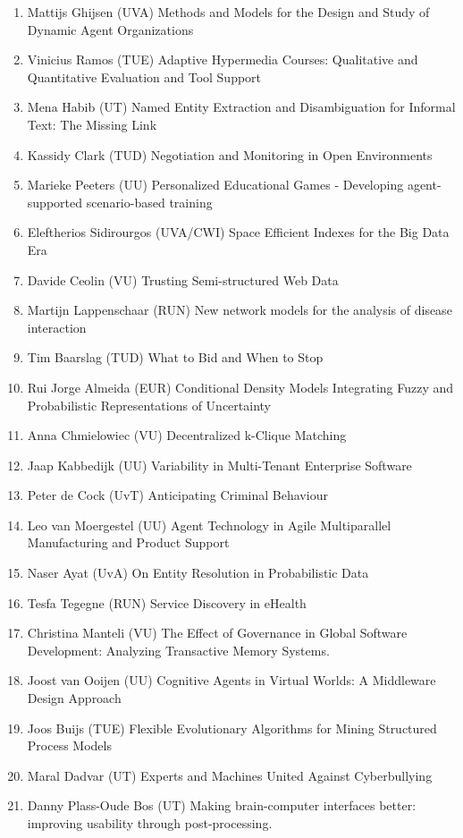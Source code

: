 \begin{multicols}{2}
\begin{scriptsize}
\begin{enumerate}[leftmargin=*,noitemsep,topsep=0pt,parsep=1pt,partopsep=0pt]
\item Mattijs Ghijsen (UVA) Methods and Models for the Design and Study of Dynamic Agent Organizations
\item Vinicius Ramos (TUE) Adaptive Hypermedia Courses: Qualitative and Quantitative Evaluation and Tool Support 
\item Mena Habib (UT) Named Entity Extraction and Disambiguation for Informal Text: The Missing Link
\item Kassidy Clark (TUD) Negotiation and Monitoring in Open Environments 
\item Marieke Peeters (UU) Personalized Educational Games - Developing agent-supported scenario-based training
\item Eleftherios Sidirourgos (UVA/CWI) Space Efficient Indexes for the Big Data Era 
\item Davide Ceolin (VU) Trusting Semi-structured Web Data
\item Martijn Lappenschaar (RUN) New network models for the analysis of disease interaction 
\item Tim Baarslag (TUD) What to Bid and When to Stop
\item Rui Jorge Almeida (EUR) Conditional Density Models Integrating Fuzzy and Probabilistic Representations of Uncertainty 
\item Anna Chmielowiec (VU) Decentralized k-Clique Matching
\item Jaap Kabbedijk (UU) Variability in Multi-Tenant Enterprise Software
\item Peter de Cock (UvT) Anticipating Criminal Behaviour
\item Leo van Moergestel (UU) Agent Technology in Agile Multiparallel Manufacturing and Product Support
\item Naser Ayat (UvA) On Entity Resolution in Probabilistic Data
\item Tesfa Tegegne (RUN) Service Discovery in eHealth
\item Christina Manteli (VU) The Effect of Governance in Global Software Development: Analyzing Transactive Memory Systems.
\item Joost van Ooijen (UU) Cognitive Agents in Virtual Worlds: A Middleware Design Approach
\item Joos Buijs (TUE) Flexible Evolutionary Algorithms for Mining Structured Process Models
\item Maral Dadvar (UT) Experts and Machines United Against Cyberbullying
\item Danny Plass-Oude Bos (UT) Making brain-computer interfaces better: improving usability through post-processing.

\end{enumerate}
\end{scriptsize}
\end{multicols}
